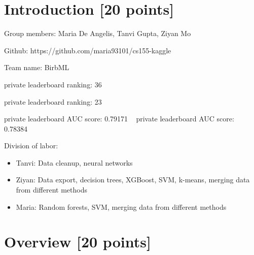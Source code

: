 \newif\ifshowsolutions
\showsolutionstrue







\pagestyle{fancy}




\newpage

\section{Introduction [20 points]}

\vspace{2ex}

\noindent
Group members: Maria De Angelis, Tanvi Gupta, Ziyan Mo

\noindent
Github: https://github.com/maria93101/cs155-kaggle

\noindent
Team name: BirbML

 private leaderboard ranking: 36

 private leaderboard ranking: 23

 private leaderboard AUC score: 0.79171
\
 private leaderboard AUC score: 0.78384

\noindent
Division of labor:
\begin{itemize}
\item Tanvi: Data cleanup, neural networks
\item Ziyan: Data export, decision trees, XGBoost, SVM, k-means, merging data from different methods
\item Maria: Random forests, SVM, merging data from different methods
\end{itemize}

\newpage

\section{Overview [20 points]}

